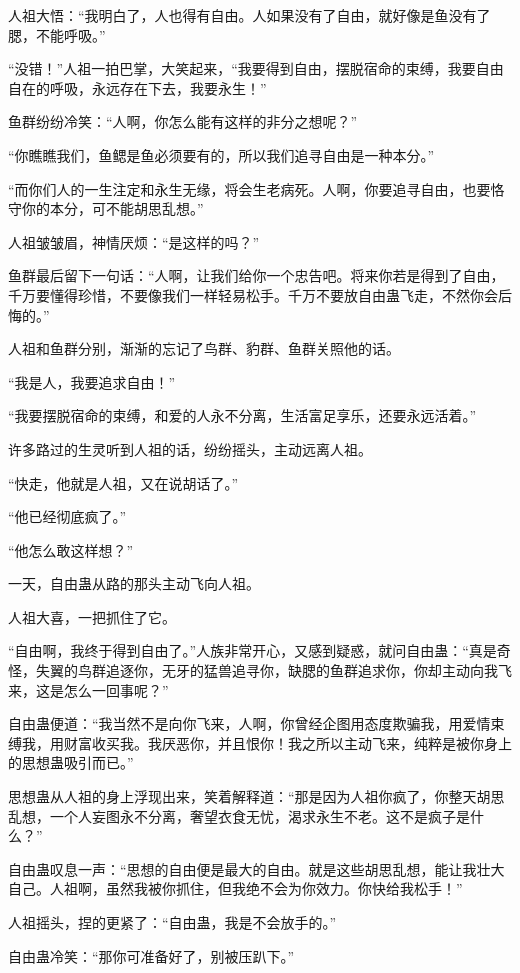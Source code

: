 \begin{this_body}
人祖大悟：“我明白了，人也得有自由。人如果没有了自由，就好像是鱼没有了腮，不能呼吸。”

“没错！”人祖一拍巴掌，大笑起来，“我要得到自由，摆脱宿命的束缚，我要自由自在的呼吸，永远存在下去，我要永生！”

鱼群纷纷冷笑：“人啊，你怎么能有这样的非分之想呢？”

“你瞧瞧我们，鱼鳃是鱼必须要有的，所以我们追寻自由是一种本分。”

“而你们人的一生注定和永生无缘，将会生老病死。人啊，你要追寻自由，也要恪守你的本分，可不能胡思乱想。”

人祖皱皱眉，神情厌烦：“是这样的吗？”

鱼群最后留下一句话：“人啊，让我们给你一个忠告吧。将来你若是得到了自由，千万要懂得珍惜，不要像我们一样轻易松手。千万不要放自由蛊飞走，不然你会后悔的。”

人祖和鱼群分别，渐渐的忘记了鸟群、豹群、鱼群关照他的话。

“我是人，我要追求自由！”

“我要摆脱宿命的束缚，和爱的人永不分离，生活富足享乐，还要永远活着。”

许多路过的生灵听到人祖的话，纷纷摇头，主动远离人祖。

“快走，他就是人祖，又在说胡话了。”

“他已经彻底疯了。”

“他怎么敢这样想？”

一天，自由蛊从路的那头主动飞向人祖。

人祖大喜，一把抓住了它。

“自由啊，我终于得到自由了。”人族非常开心，又感到疑惑，就问自由蛊：“真是奇怪，失翼的鸟群追逐你，无牙的猛兽追寻你，缺腮的鱼群追求你，你却主动向我飞来，这是怎么一回事呢？”

自由蛊便道：“我当然不是向你飞来，人啊，你曾经企图用态度欺骗我，用爱情束缚我，用财富收买我。我厌恶你，并且恨你！我之所以主动飞来，纯粹是被你身上的思想蛊吸引而已。”

思想蛊从人祖的身上浮现出来，笑着解释道：“那是因为人祖你疯了，你整天胡思乱想，一个人妄图永不分离，奢望衣食无忧，渴求永生不老。这不是疯子是什么？”

自由蛊叹息一声：“思想的自由便是最大的自由。就是这些胡思乱想，能让我壮大自己。人祖啊，虽然我被你抓住，但我绝不会为你效力。你快给我松手！”

人祖摇头，捏的更紧了：“自由蛊，我是不会放手的。”

自由蛊冷笑：“那你可准备好了，别被压趴下。”


\end{this_body}
